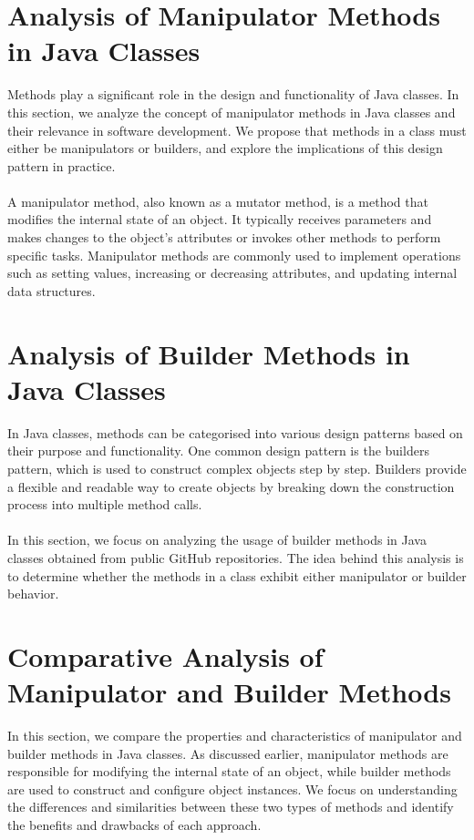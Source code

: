 \documentclass[draft]{article}
\begin{document}
\section{Analysis of Manipulator Methods in Java Classes}
Methods play a significant role in the design and functionality of Java classes. In this section, we analyze the concept of manipulator methods in Java classes and their relevance in software development. We propose that methods in a class must either be manipulators or builders, and explore the implications of this design pattern in practice.\\
~\\
A manipulator method, also known as a mutator method, is a method that modifies the internal state of an object. It typically receives parameters and makes changes to the object's attributes or invokes other methods to perform specific tasks. Manipulator methods are commonly used to implement operations such as setting values, increasing or decreasing attributes, and updating internal data structures.\\

\newpage
\section{Analysis of Builder Methods in Java Classes}
In Java classes, methods can be categorised into various design patterns based on their purpose and functionality. One common design pattern is the builders pattern, which is used to construct complex objects step by step. Builders provide a flexible and readable way to create objects by breaking down the construction process into multiple method calls.\\
~\\
In this section, we focus on analyzing the usage of builder methods in Java classes obtained from public GitHub repositories. The idea behind this analysis is to determine whether the methods in a class exhibit either manipulator or builder behavior.

\newpage
\section{Comparative Analysis of Manipulator and Builder Methods}
In this section, we compare the properties and characteristics of manipulator and builder methods in Java classes. As discussed earlier, manipulator methods are responsible for modifying the internal state of an object, while builder methods are used to construct and configure object instances. We focus on understanding the differences and similarities between these two types of methods and identify the benefits and drawbacks of each approach.
\end{document}
